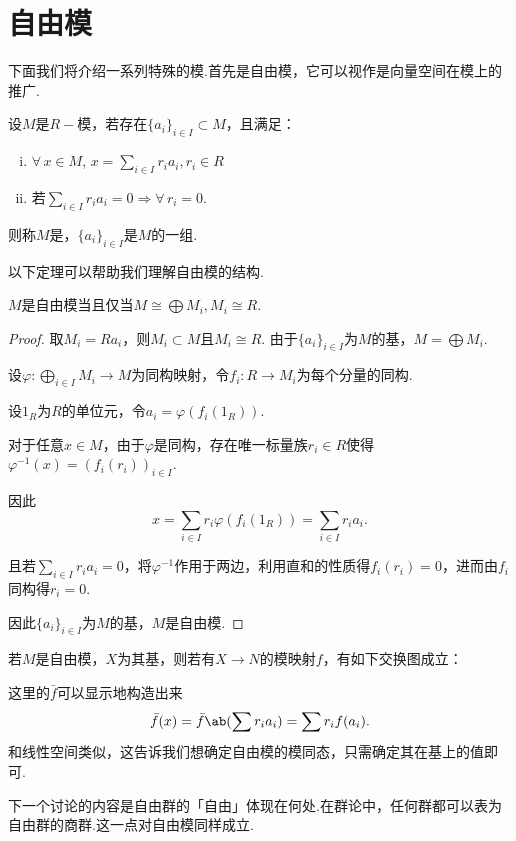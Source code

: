 \section{自由模}
下面我们将介绍一系列特殊的模.首先是自由模，它可以视作是向量空间在模上的推广.\par

\begin{definition}[自由模]
    设$M$是$R-\!\!$模，若存在$\{a_i\}_{i\in I} \subset M$，且满足：
    \begin{enumerate}[(i)]
        \item $\forall\, x \in M$, $x = \sum_{i \in I} r_i a_i, r_i \in R$
        \item 若$\sum_{i \in I} r_i a_i = 0 \Rightarrow \forall\, r_i = 0$.
    \end{enumerate}
    则称$M$是，$\{a_i\}_{i\in I}$是$M$的一组.
\end{definition}

以下定理可以帮助我们理解自由模的结构.
\begin{proposition}[]
    $M$是自由模当且仅当$ M \cong \bigoplus M_i, M_i \cong R$.
\end{proposition}
\begin{proof}
    \fbox{$\Rightarrow$} 取$M_i = R a_i$，则$M_i \subset M$且$M_i \cong R$.
    由于$\{a_i\}_{i\in I}$为$M$的基，$M = \bigoplus M_i$.

    \fbox{$\Leftarrow$} 设$\varphi: \bigoplus_{i \in I} M_i \to M$为同构映射，令$f_i: R \to M_i$为每个分量的同构.\par
    设$1_R$为$R$的单位元，令$a_i = \varphi(f_i(1_R))$. \par
    对于任意$x \in M$，由于$\varphi$是同构，存在唯一标量族$r_i \in R$使得$\varphi^{-1}(x) = (f_i(r_i))_{i\in I}$.\par
    因此\begin{equation*}
        x = \sum_{i \in I} r_i \varphi(f_i(1_R)) = \sum_{i \in I} r_i a_i.
    \end{equation*}

    且若$\sum_{i \in I} r_i a_i = 0$，将$\varphi^{-1}$作用于两边，利用直和的性质得$f_i(r_i) = 0$，进而由$f_i$同构得$r_i = 0$. \par
    因此$\{a_i\}_{i \in I}$为$M$的基，$M$是自由模.
\end{proof}

若$M$是自由模，$X$为其基，则若有$X \to N$的模映射$f$，有如下交换图成立：
\begin{center}
\end{center}
这里的$\bar{f}$可以显示地构造出来\begin{equation*}
    \bar{f}(x) = \bar{f}\ab(\sum r_i a_i) = \sum r_i f(a_i).
\end{equation*}
和线性空间类似，这告诉我们想确定自由模的模同态，只需确定其在基上的值即可.\par
下一个讨论的内容是自由群的「自由」体现在何处.在群论中，任何群都可以表为自由群的商群.这一点对自由模同样成立.

